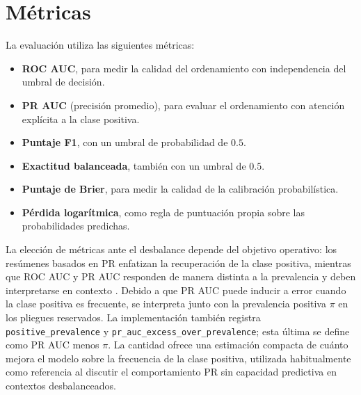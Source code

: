 \section{Métricas}
La evaluación utiliza las siguientes métricas:

\begin{itemize}
  \item \textbf{ROC AUC}, para medir la calidad del ordenamiento con independencia del umbral de decisión.
  \item \textbf{PR AUC} (precisión promedio), para evaluar el ordenamiento con atención explícita a la clase positiva.
  \item \textbf{Puntaje F1}, con un umbral de probabilidad de $0.5$.
  \item \textbf{Exactitud balanceada}, también con un umbral de $0.5$.
  \item \textbf{Puntaje de Brier}, para medir la calidad de la calibración probabilística.
  \item \textbf{Pérdida logarítmica}, como regla de puntuación propia sobre las probabilidades predichas.
\end{itemize}

La elección de métricas ante el desbalance depende del objetivo operativo: los resúmenes basados en PR enfatizan la recuperación de la clase positiva, mientras que ROC AUC y PR AUC responden de manera distinta a la prevalencia y deben interpretarse en contexto \parencite{richardson2024roc}. Debido a que PR AUC puede inducir a error cuando la clase positiva es frecuente, se interpreta junto con la prevalencia positiva $\pi$ en los pliegues reservados. La implementación también registra \texttt{positive\_prevalence} y \texttt{pr\_auc\_excess\_over\_prevalence}; esta última se define como PR AUC menos $\pi$. La cantidad ofrece una estimación compacta de cuánto mejora el modelo sobre la frecuencia de la clase positiva, utilizada habitualmente como referencia al discutir el comportamiento PR sin capacidad predictiva en contextos desbalanceados.
